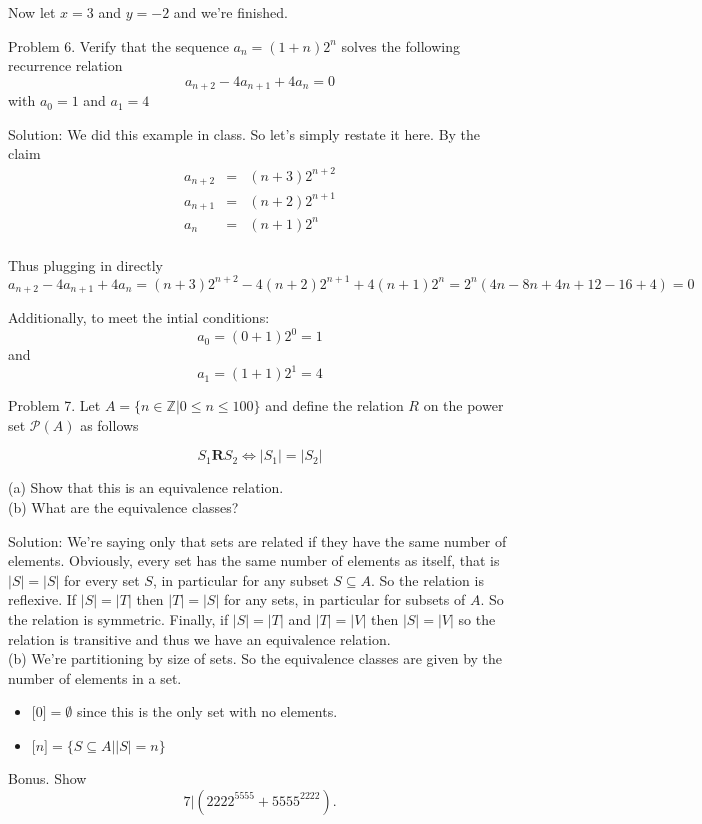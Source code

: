 \documentclass[16 pt]{amsart}
\theoremstyle{definition}
\theoremstyle{remark}
\numberwithin{equation}{subsection}
\newcommand{\Z}{\mathbb{Z}}
\begin{document}
Now let $x=3$ and $y=-2$ and we're finished.



\newpage
Problem 6.
Verify that the sequence $a_n =(1+n) 2^n $ solves the following recurrence relation
\[
a_{n+2} - 4a_{n+1} + 4a_n = 0 
\]
with $a_0 =1$ and $a_1 = 4$


\vspace{.5in}

Solution:  We did this example in class.  So let's simply restate it here.  By the claim
\begin{eqnarray*}
a_{n+2} & = & (n+3)2^{n+2}\\
a_{n+1} & = & (n+2)2^{n+1}\\
a_{n} & = & (n+1)2^{n}\\
\end{eqnarray*}

Thus plugging in directly
\[
a_{n+2} - 4a_{n+1} + 4a_n = (n+3)2^{n+2} - 4 (n+2)2^{n+1} + 4(n+1)2^n = 2^n(4n - 8n + 4n + 12 - 16 + 4) = 0
\]

Additionally, to meet the intial conditions:
\[
a_0 = (0+1)2^0 = 1
\]
and
\[
a_1 = (1+1)2^1 = 4
\]

\newpage

Problem 7. Let $A= \{n \in \Z | 0\le n \le 100\}$ and define the relation $R$ on the power set $\mathcal{P}(A)$ as follows

\[
S_1 \textbf{R} S_2 \iff |S_1| = |S_2|
\]


(a) Show that this is an equivalence relation.\\

(b) What are the equivalence classes?\\


\vspace{.5in}

Solution: We're saying only that sets are related if they have the same number of elements.  Obviously, every set has the same number of elements as itself, that is $|S|=|S|$ for every set $S$, in particular for any subset $S\subseteq A$.  So the relation is reflexive.  If $|S|=|T|$ then $|T|=|S|$ for any sets, in particular for subsets of $A$.  So the relation is symmetric.  Finally, if $|S|=|T|$ and $|T|=|V|$ then $|S| = |V|$ so the relation is transitive and thus we have an equivalence relation.\\


(b) We're partitioning by size of sets.  So the equivalence classes are given by the number of elements in a set.
\begin{itemize}
\item[] $\lbrack 0 \rbrack = \emptyset$ since this is the only set with no elements.\\
\item[] $\lbrack n \rbrack = \{S\subseteq A| |S|=n \}$
\end{itemize}



\newpage

Bonus. Show 
\[
7 | (2222^{5555} + 5555^{2222}).
\]
\end{document}
